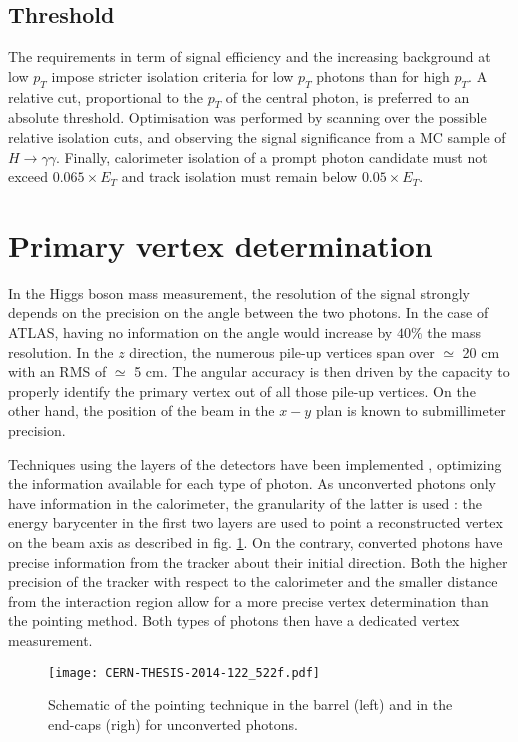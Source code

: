 \subsection{Threshold}
  \label{sec:org7d75ff3}

The requirements in term of signal efficiency and the increasing background at low $p_T$ impose stricter isolation criteria for low $p_T$ photons than for high $p_T$.
A relative cut, proportional to the $p_T$ of the central photon, is preferred to an absolute threshold.
Optimisation was performed by scanning over the possible relative isolation cuts, and observing the signal significance from a MC sample of \(H\rightarrow\gamma\gamma\).
Finally, calorimeter isolation of a prompt photon candidate must not exceed \(0.065\times E_T\) and track isolation must remain below \(0.05\times E_T\).

\section{Primary vertex determination}
\label{sec:orgbd5d583}
In the Higgs boson mass measurement, the resolution of the signal strongly depends on the precision on the angle between the two photons.
In the case of ATLAS, having no information on the angle would increase by \(40\%\) the mass resolution.
In the $z$ direction, the numerous pile-up vertices span over $\simeq$ 20 cm with an RMS of $\simeq$ 5 cm.
The angular accuracy is then driven by the capacity to properly identify the primary vertex out of all those pile-up vertices.
On the other hand, the position of the beam in the \(x-y\) plan is known to submillimeter precision.

Techniques using the layers of the detectors have been implemented \cite{ATL-PHYS-INT-2010-013,CERN-THESIS-2008-047}, optimizing the information available for each type of photon.
As unconverted photons only have information in the calorimeter, the granularity of the latter is used : the energy barycenter in the first two layers are used to point a reconstructed vertex on the beam axis as described in fig. \ref{fig:Calibration_RecoID_pointing}.
On the contrary, converted photons have precise information from the tracker about their initial direction.
Both the higher precision of the tracker with respect to the calorimeter and the smaller distance from the interaction region allow for a more precise vertex determination than the pointing method.
Both types of photons then have a dedicated vertex measurement.

\begin{figure}
  \centering
  \texttt{[image: CERN-THESIS-2014-122\_522f.pdf]}
  \caption{Schematic of the pointing technique in the barrel (left) and in the end-caps (righ) for unconverted photons.\cite{CERN-THESIS-2014-122}}\label{fig:Calibration_RecoID_pointing}
\end{figure}


